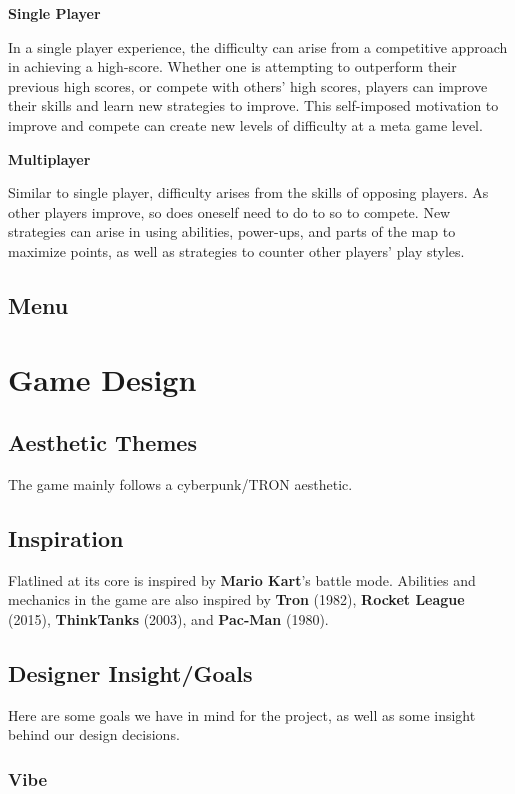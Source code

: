 \documentclass{article}
\newcommand{\name}{Flatlined}
\theoremstyle{definition}
\begin{document}
\textbf{Single Player}

In a single player experience, the difficulty can arise
from a competitive approach in achieving a high-score. Whether one is
attempting to outperform their previous high scores, or compete with others'
high scores, players can improve their skills and learn new strategies to
improve. This self-imposed motivation to improve and compete can create new
levels of difficulty at a meta game level.

\textbf{Multiplayer}

Similar to single player, difficulty arises from the skills of opposing
players. As other players improve, so does oneself need to do to so to compete.
New strategies can arise in using abilities, power-ups, and parts of the map to
maximize points, as well as strategies to counter other players' play styles.

\subsection{Menu}

\section{Game Design}

\subsection{Aesthetic Themes}

The game mainly follows a cyberpunk/TRON aesthetic.

\subsection{Inspiration}

\name{} at its core is inspired by \textbf{Mario Kart}'s battle mode. Abilities
and mechanics in the game are also inspired by \textbf{Tron} (1982),
\textbf{Rocket League} (2015), \textbf{ThinkTanks} (2003), and \textbf{Pac-Man}
(1980).

\subsection{Designer Insight/Goals}

Here are some goals we have in mind for the project, as well as some insight
behind our design decisions.

\subsubsection{Vibe}
\end{document}
